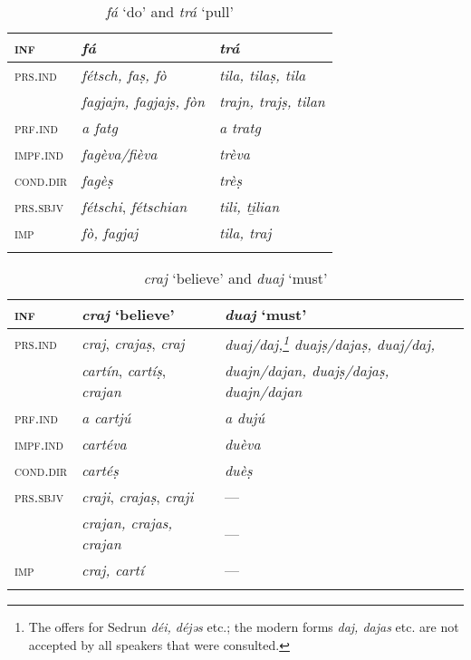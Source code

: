 \begin{table}
	\caption{\textit{fá} `do' and \textit{trá} `pull'}

	\begin{tabular}{lll}
		\lsptoprule
		\textsc{inf} & \textit{\textbf{fá}} & \textit{\textbf{trá}}\\
		\midrule
		\textsc{prs.ind} & \textit{fétsch, faṣ, fò} & \textit{tila, tilaṣ, tila}\\
		& \textit{fagjajn, fagjajṣ, fòn} & \textit{trajn, trajṣ, tilan}\\
		\textsc{prf.ind} & \textit{a fatg} & \textit{a tratg}\\
		\textsc{impf.ind} & \textit{fagèva/fièva} & \textit{trèva} \\
		\textsc{cond.dir} & \textit{fagèṣ} & \textit{trèṣ}\\ 
		\textsc{prs.sbjv} & \textit{fétschi}, \textit{fétschian} & \textit{tili, ti̱lian}\\
		\textsc{imp} & \textit{fò, fagjaj} & \textit{tila, traj}\\
		\lspbottomrule
	\end{tabular}
\end{table}

\begin{table}
	\caption{\textit{craj} `believe' and \textit{duaj} `must'}

	\begin{tabular}{lll}
		\lsptoprule
		\textsc{inf} & \textit{\textbf{craj}} `believe' & \textit{\textbf{duaj}} `must'\\
		\midrule
		\textsc{prs.ind} & \textit{craj}, \textit{crajaṣ}, \textit{craj} & \textit{duaj/daj,\footnote{The \DRG{4}{370} offers for Sedrun \textit{déi, déjǝs} etc.; the modern forms \textit{daj, dajas} etc. are not accepted by all speakers that were consulted.} duajṣ/dajaṣ, duaj/daj,}\\
		& \textit{cartín}, \textit{cartíṣ}, \textit{crajan} & \textit{duajn/dajan, duajṣ/dajaṣ, duajn/dajan}\\
		\textsc{prf.ind} & \textit{a cartjú} & \textit{a dujú}\\
		\textsc{impf.ind} & \textit{cartéva} & \textit{duèva} \\
		\textsc{cond.dir} & \textit{cartéṣ} & \textit{duèṣ}\\
		\textsc{prs.sbjv} & \textit{craji}, \textit{crajaṣ}, \textit{craji} & --- \\
		&\textit{crajan, crajas, crajan} & --- \\
		\textsc{imp} & \textit{craj, cartí} & --- \\
		\lspbottomrule
	\end{tabular}
\end{table}

